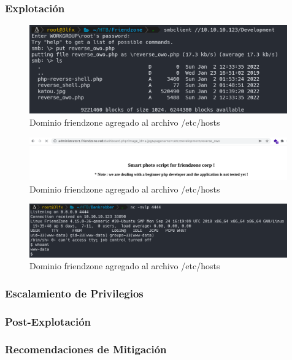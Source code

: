     \subsubsection{Explotación}

    \begin{figure}[H]
        \centering
        \includegraphics[width=0.99\textwidth]{informe4/imagenes/friendzone/17_reverse_shell_upload.png}
        \caption{Dominio friendzone agregado al archivo /etc/hosts} 
    \end{figure}

    \begin{figure}[H]
        \centering
        \includegraphics[width=0.99\textwidth]{informe4/imagenes/friendzone/18_consult.png}
        \caption{Dominio friendzone agregado al archivo /etc/hosts} 
    \end{figure}

    \begin{figure}[H]
        \centering
        \includegraphics[width=0.99\textwidth]{informe4/imagenes/friendzone/19_conexion_wwwdata.png}
        \caption{Dominio friendzone agregado al archivo /etc/hosts} 
    \end{figure}
    \subsubsection{Escalamiento de Privilegios}

    \subsubsection{Post-Explotación}

    \subsubsection{Recomendaciones de Mitigación}
